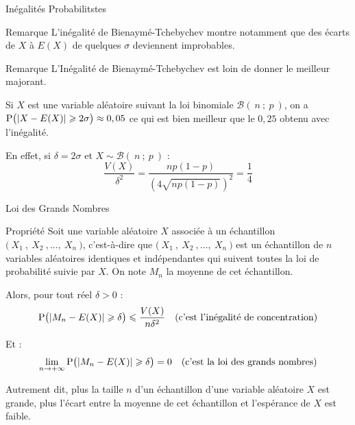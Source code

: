 \documentclass{cours}
\begin{document}
\begin{Gpartie}{Inégalités Probabilitstes}
\begin{Spartie}{Remarque}
            L'inégalité de Bienaymé-Tchebychev montre notamment que des écarts de $X$ à $E(X)$ de quelques $\sigma$ deviennent improbables.
        \end{Spartie}
        \begin{Spartie}{Remarque} 
            L'Inégalité de Bienaymé-Tchebychev est loin de donner le meilleur majorant.

            Si $X$ est une variable aléatoire suivant la loi binomiale $\mathcal{B}\left(~n~;~p~\right)$, on a $\mathrm{P}\big(\vert X-E(X)\rvert\geqslant 2\sigma\big)\approx 0,05$ ce qui est bien meilleur que le $0,25$ obtenu avec l'inégalité.

            En effet, si $\delta=2\sigma$ et $X\sim\mathcal{B}(~n~;~p~)$ : \[\frac{V(X)}{\delta^2}=\frac{np(1-p)}{\left(4\sqrt{np(1-p)}\right)^2}=\frac{1}{4}\]
        \end{Spartie}
    \end{Gpartie}
    \pagebreak
    \begin{Gpartie}{Loi des Grands Nombres} 
        \begin{Spartie}{Propriété} 
            Soit une variable aléatoire $X$ associée à un échantillon $\big(~X_1~,~X_2~,\dotsc,~X_n~\big)$, c'est-à-dire que $\big(~X_1~,~X_2~,\dotsc,~X_n~\big)$ est un échantillon de $n$ variables aléatoires identiques et indépendantes qui suivent toutes la loi de probabilité suivie par $X$. On note $M_n$ la moyenne de cet échantillon. 
            
            Alors, pour tout réel $\delta>0$ : \[\mathrm{P}\big(\lvert M_n-E(X)\rvert\geqslant\delta\big)\leqslant\frac{V(X)}{n\delta^2}\quad\text{(c'est l'inégalité de concentration)}\]

            Et : \[\lim\limits_{n\to +\infty}\mathrm{P}\big(\lvert M_n-E(X)\rvert\geqslant\delta\big)=0\quad\text{(c'est la loi des grands nombres)}\]

            Autrement dit, plus la taille $n$ d'un échantillon d'une variable aléatoire $X$ est grande, plus l'écart entre la moyenne de cet échantillon et l'espérance de $X$ est faible.
        \end{Spartie}
    \end{Gpartie}
\end{document}
